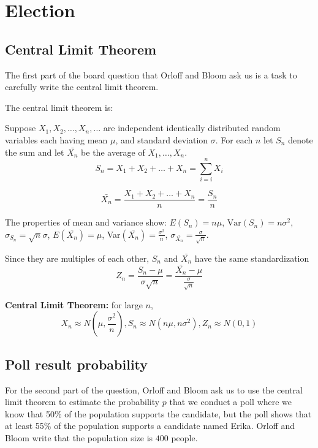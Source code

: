 \documentclass[a4paper,11pt]{article}
\begin{document}
\section{Election}
\subsection{Central Limit Theorem}
The first part of the board question that Orloff and Bloom ask
us is a task to carefully write the central limit theorem.

The central limit theorem is:

Suppose $X_1, X_2, \ldots, X_n, \ldots$ are independent identically distributed
random variables each having mean $\mu$, and standard deviation $\sigma$. For
each $n$ let $S_n$ denote the sum and let $\bar{X_n}$ be the average of
$X_1, \ldots, X_n$.
\begin{equation}
  S_n = X_1 + X_2 + \ldots + X_n = \sum_{i=i}^n X_i
\end{equation}

\begin{equation}
  \bar{X_n} = \frac{X_1 + X_2 + \ldots + X_n}{n} = \frac{S_n}{n}
\end{equation}

The properties of mean and variance show: $E\left(S_n\right)=n\mu$,
$\text{Var}\left( S_n \right)=n\sigma^2$, $\sigma_{S_n}=\sqrt{n}\sigma$,
$E\left(\bar{X_n}\right) = \mu$, Var$\left(\bar{X_n}\right)=\frac{\sigma^2}{n}$,
$\sigma_{\bar{X_n}} = \frac{\sigma}{\sqrt{n}}$.

Since they are multiples of each other, $S_n$ and $\bar{X_n}$ have the same
standardization
\begin{equation}
  Z_n = \frac{S_n- \mu}{\sigma\sqrt{n}}
  = \frac{\bar{X_{n}} - \mu}{\frac{\sigma}{\sqrt{n}}}
\end{equation}

\textbf{Central Limit Theorem:} for large $n$,
\begin{equation}
X_n \approx  N\left( \mu, \frac{\sigma^2}{n} \right), S_n \approx N\left(n\mu, n\sigma^2 \right),
  Z_n \approx N \left(0, 1\right)
\end{equation}

\subsection{Poll result probability}
For the second part of the question, Orloff and Bloom ask us to
use the central limit theorem to estimate the probability $p$
that we conduct a poll where we know that 50\% of the population
supports the candidate, but the poll shows that at least 55\% of the population
supports a candidate named Erika.  Orloff and Bloom write that the
population size is $400$ people.
\end{document}
